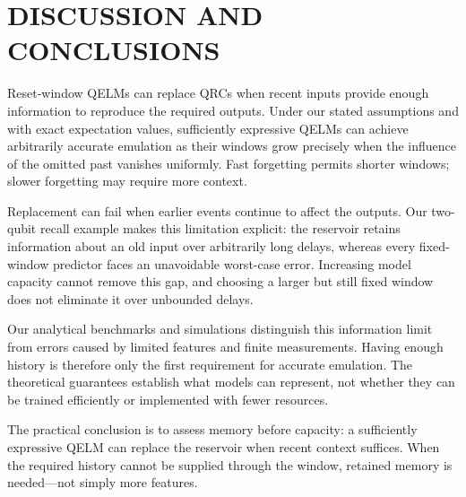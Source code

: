 \section{DISCUSSION AND CONCLUSIONS}
\label{sec:summary}

Reset-window QELMs can replace QRCs when recent inputs provide enough
information to reproduce the required outputs. Under our stated assumptions
and with exact expectation values, sufficiently expressive QELMs can achieve
arbitrarily accurate emulation as their windows grow precisely when the
influence of the omitted past vanishes uniformly. Fast forgetting permits
shorter windows; slower forgetting may require more context.

Replacement can fail when earlier events continue to affect the outputs.
Our two-qubit recall example makes this limitation explicit: the reservoir
retains information about an old input over arbitrarily long delays,
whereas every fixed-window predictor faces an unavoidable worst-case error.
Increasing model capacity cannot remove this gap, and choosing a larger but
still fixed window does not eliminate it over unbounded delays.

Our analytical benchmarks and simulations distinguish this information
limit from errors caused by limited features and finite measurements.
Having enough history is therefore only the first requirement for accurate
emulation. The theoretical guarantees establish what models can represent,
not whether they can be trained efficiently or implemented with fewer
resources.

The practical conclusion is to assess memory before capacity: a sufficiently
expressive QELM can replace the reservoir when recent context suffices.
When the required history cannot be supplied through the window, retained
memory is needed---not simply more features.
